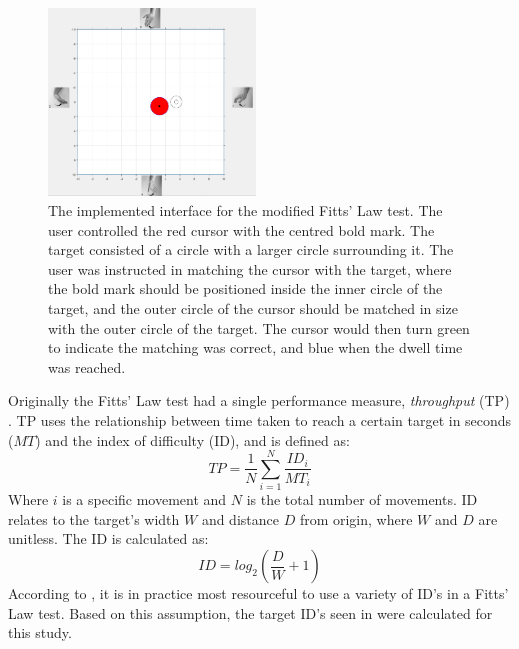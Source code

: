 \begin{figure}[H] 
	\includegraphics[width=0.49\textwidth]{figures/Paper/perftestGUI}
	\caption{The implemented interface for the modified Fitts' Law test. The user controlled the red cursor with the centred bold mark. The target consisted of a circle with a larger circle surrounding it. The user was instructed in matching the cursor with the target, where the bold mark should be positioned inside the inner circle of the target, and the outer circle of the cursor should be matched in size with the outer circle of the target. The cursor would then turn green to indicate the matching was correct, and blue when the dwell time was reached.}
	\label{fig:fittsLawTask}
\end{figure}
\vspace{-0.2cm}
Originally the Fitts' Law test had a single performance measure, \textit{throughput} (TP) \cite{Fitts1954}. TP uses the relationship between time taken to reach a certain target in seconds ($MT$) and the index of difficulty (ID), and is defined as:
\begin{equation} \label{eq:TP}
TP=\frac{1}{N}\sum_{i=1}^{N} \frac{ID_i}{MT_i} 
\end{equation}
\noindent Where $i$ is a specific movement and $N$ is the total number of movements. ID relates to the target's width $W$ and distance $D$ from origin, where $W$ and $D$ are unitless. The ID is calculated as: 
\begin{equation} \label{eq:ID}
ID=log_2(\frac{D}{W}+1)
\end{equation}
\noindent According to \cite{Scheme2013a}, it is in practice most resourceful to use a variety of ID's in a Fitts' Law test. Based on this assumption, the target ID's seen in  were calculated for this study.
